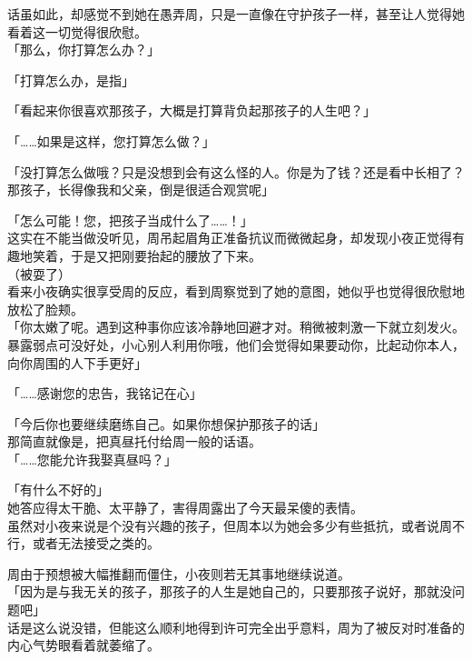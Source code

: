 话虽如此，却感觉不到她在愚弄周，只是一直像在守护孩子一样，甚至让人觉得她看着这一切觉得很欣慰。\\

「那么，你打算怎么办？」

「打算怎么办，是指」

「看起来你很喜欢那孩子，大概是打算背负起那孩子的人生吧？」

「……如果是这样，您打算怎么做？」

「没打算怎么做哦？只是没想到会有这么怪的人。你是为了钱？还是看中长相了？那孩子，长得像我和父亲，倒是很适合观赏呢」

「怎么可能！您，把孩子当成什么了……！」\\

这实在不能当做没听见，周吊起眉角正准备抗议而微微起身，却发现小夜正觉得有趣地笑着，于是又把刚要抬起的腰放了下来。\\

（被耍了）\\

看来小夜确实很享受周的反应，看到周察觉到了她的意图，她似乎也觉得很欣慰地放松了脸颊。\\

「你太嫩了呢。遇到这种事你应该冷静地回避才对。稍微被刺激一下就立刻发火。暴露弱点可没好处，小心别人利用你哦，他们会觉得如果要动你，比起动你本人，向你周围的人下手更好」

「……感谢您的忠告，我铭记在心」

「今后你也要继续磨练自己。如果你想保护那孩子的话」\\

那简直就像是，把真昼托付给周一般的话语。\\

「……您能允许我娶真昼吗？」

「有什么不好的」\\

她答应得太干脆、太平静了，害得周露出了今天最呆傻的表情。\\

虽然对小夜来说是个没有兴趣的孩子，但周本以为她会多少有些抵抗，或者说周不行，或者无法接受之类的。

周由于预想被大幅推翻而僵住，小夜则若无其事地继续说道。\\

「因为是与我无关的孩子，那孩子的人生是她自己的，只要那孩子说好，那就没问题吧」\\

话是这么说没错，但能这么顺利地得到许可完全出乎意料，周为了被反对时准备的内心气势眼看着就萎缩了。\\

